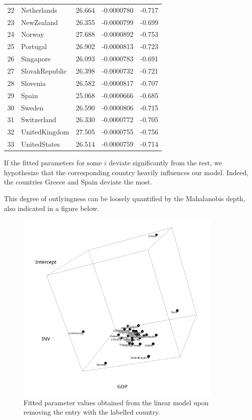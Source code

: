 \documentclass[10pt]{article}
\begin{document}
\begin{table}[H]
\begin{tabular}{rlrrr}
              22 & Netherlands & 26.664 & -0.0000780 & -0.717 \\
              23 & NewZealand & 26.355 & -0.0000799 & -0.699 \\
              24 & Norway & 27.688 & -0.0000892 & -0.753 \\
              25 & Portugal & 26.902 & -0.0000813 & -0.723 \\
              26 & Singapore & 26.093 & -0.0000783 & -0.691 \\
              27 & SlovakRepublic & 26.398 & -0.0000732 & -0.721 \\
              28 & Slovenia & 26.582 & -0.0000817 & -0.707 \\
              29 & Spain & 25.068 & -0.0000666 & -0.685 \\
              30 & Sweden & 26.590 & -0.0000806 & -0.715 \\
              31 & Switzerland & 26.330 & -0.0000772 & -0.705 \\
              32 & UnitedKingdom & 27.505 & -0.0000755 & -0.756 \\
              33 & UnitedStates & 26.514 & -0.0000759 & -0.714 \\
           \hline
        \end{tabular}
    \end{table}

    If the fitted parameters for some $i$  deviate significantly from the rest, we
    hypothesize that the corresponding country heavily influences our model. Indeed,
    the countries Greece and Spain deviate the most.

    This degree of outlyingness can be loosely quantified by the Mahalanobis depth,
    also indicated in a figure below.

    \begin{figure}[H]
    \begin{center}
        \includegraphics[width=0.9\textwidth]{loocv.png}
    \end{center}
    \caption{Fitted parameter values obtained from the linear model upon removing the
    entry with the labelled country.}
    \label{fig:loocv}
    \end{figure}
\end{document}
